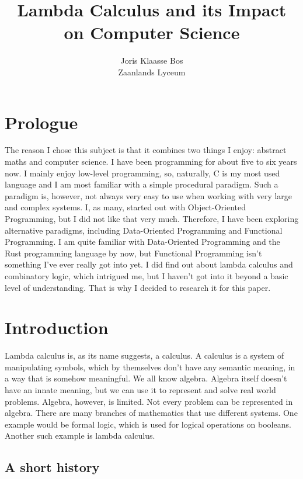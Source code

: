 \documentclass[a4paper]{article}
\title{Lambda Calculus and its Impact on Computer Science}
\author{Joris Klaasse Bos\\ Zaanlands Lyceum}
\begin{document}
\maketitle

\section{Prologue}

The reason I chose this subject is that it combines two things I enjoy:
abstract maths and computer science. I have been programming for about five to
six years now. I mainly enjoy low-level programming, so, naturally, C is my
most used language and I am most familiar with a simple procedural paradigm.
Such a paradigm is, however, not always very easy to use when working with very
large and complex systems. I, as many, started out with Object-Oriented
Programming, but I did not like that very much. Therefore, I have been
exploring alternative paradigms, including Data-Oriented Programming and
Functional Programming. I am quite familiar with Data-Oriented Programming and
the Rust programming language by now, but Functional Programming isn't
something I've ever really got into yet. I did find out about lambda calculus
and combinatory logic, which intrigued me, but I haven’t got into it beyond a
basic level of understanding. That is why I decided to research it for this
paper. 

\section{Introduction}

Lambda calculus is, as its name suggests, a calculus. A calculus is a system of
manipulating symbols, which by themselves don't have any semantic meaning, in a
way that is somehow meaningful. We all know algebra. Algebra itself doesn't
have an innate meaning, but we can use it to represent and solve real world
problems. Algebra, however, is limited. Not every problem can be represented in
algebra. There are many branches of mathematics that use different systems.
One example would be formal logic, which is used for logical operations on
booleans. Another such example is lambda calculus.

\subsection{A short history}

\end{document}
